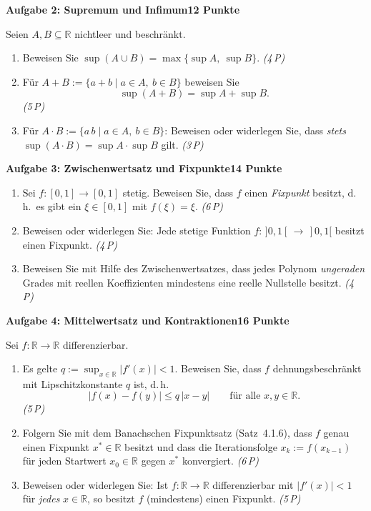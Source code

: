 \documentclass[a4paper,12pt]{article}
\newcommand{\pkt}[1]{\hfill\textit{(#1\,P)}}
\newcommand{\aufgabe}[3]{%
  \bigskip\par\noindent\textbf{Aufgabe #1: #2}\hfill\textbf{#3 Punkte}%
  \par\nobreak\medskip}
\begin{document}
\aufgabe{2}{Supremum und Infimum}{12}

Seien $A,B\subseteq\mathbb{R}$ nichtleer und beschränkt.
\begin{enumerate}[label=\alph*)]
  \item Beweisen Sie $\displaystyle\sup(A\cup B)=\max\{\sup A,\ \sup B\}$. \pkt{4}
  \item Für $A+B:=\{a+b\mid a\in A,\ b\in B\}$ beweisen Sie
  \[ \sup(A+B)=\sup A+\sup B. \]
  \pkt{5}
  \item Für $A\cdot B:=\{a\,b\mid a\in A,\ b\in B\}$: Beweisen oder widerlegen Sie, dass \emph{stets}
  $\sup(A\cdot B)=\sup A\cdot\sup B$ gilt. \pkt{3}
\end{enumerate}

\aufgabe{3}{Zwischenwertsatz und Fixpunkte}{14}

\begin{enumerate}[label=\alph*)]
  \item Sei $f:[0,1]\to[0,1]$ stetig. Beweisen Sie, dass $f$ einen \emph{Fixpunkt} besitzt,
  d.\,h.\ es gibt ein $\xi\in[0,1]$ mit $f(\xi)=\xi$. \pkt{6}
  \item Beweisen oder widerlegen Sie: Jede stetige Funktion $f:\,]0,1[\,\to\,]0,1[$ besitzt einen Fixpunkt. \pkt{4}
  \item Beweisen Sie mit Hilfe des Zwischenwertsatzes, dass jedes Polynom \emph{ungeraden} Grades
  mit reellen Koeffizienten mindestens eine reelle Nullstelle besitzt. \pkt{4}
\end{enumerate}

\aufgabe{4}{Mittelwertsatz und Kontraktionen}{16}

Sei $f:\mathbb{R}\to\mathbb{R}$ differenzierbar.
\begin{enumerate}[label=\alph*)]
  \item Es gelte $q:=\sup_{x\in\mathbb{R}}|f'(x)|<1$. Beweisen Sie, dass $f$ dehnungsbeschränkt
  mit Lipschitzkonstante $q$ ist, d.\,h.
  \[ |f(x)-f(y)|\le q\,|x-y|\qquad\text{für alle }x,y\in\mathbb{R}. \]
  \pkt{5}
  \item Folgern Sie mit dem Banachschen Fixpunktsatz (Satz~4.1.6), dass $f$ genau einen Fixpunkt
  $x^\ast\in\mathbb{R}$ besitzt und dass die Iterationsfolge $x_k:=f(x_{k-1})$ für jeden Startwert
  $x_0\in\mathbb{R}$ gegen $x^\ast$ konvergiert. \pkt{6}
  \item Beweisen oder widerlegen Sie: Ist $f:\mathbb{R}\to\mathbb{R}$ differenzierbar mit $|f'(x)|<1$
  für \emph{jedes} $x\in\mathbb{R}$, so besitzt $f$ (mindestens) einen Fixpunkt. \pkt{5}
\end{enumerate}
\end{document}
